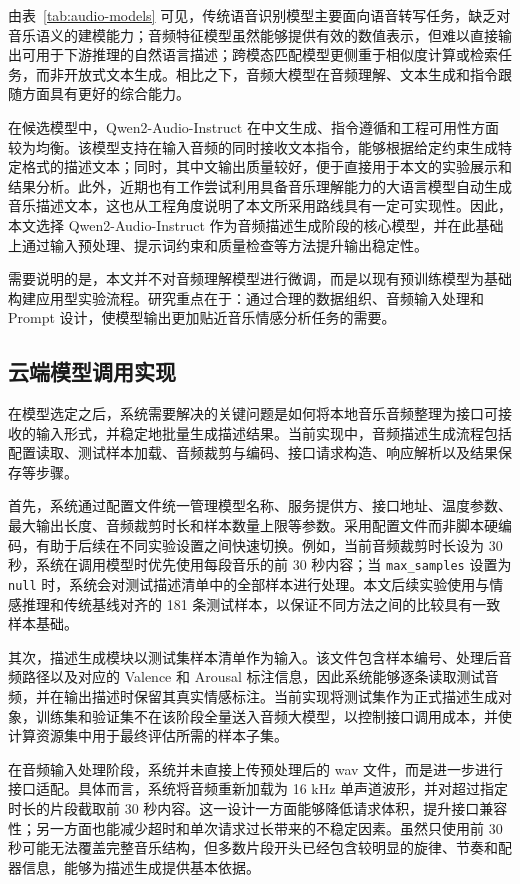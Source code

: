 由表~\ref{tab:audio-models} 可见，传统语音识别模型主要面向语音转写任务，缺乏对音乐语义的建模能力；音频特征模型虽然能够提供有效的数值表示，但难以直接输出可用于下游推理的自然语言描述；跨模态匹配模型更侧重于相似度计算或检索任务，而非开放式文本生成。相比之下，音频大模型在音频理解、文本生成和指令跟随方面具有更好的综合能力\cite{tang2023salmonn,chu2024qwen2audio}。

在候选模型中，Qwen2-Audio-Instruct\cite{chu2024qwen2audio} 在中文生成、指令遵循和工程可用性方面较为均衡。该模型支持在输入音频的同时接收文本指令，能够根据给定约束生成特定格式的描述文本；同时，其中文输出质量较好，便于直接用于本文的实验展示和结果分析。此外，近期也有工作尝试利用具备音乐理解能力的大语言模型自动生成音乐描述文本\cite{zhang2024musicpatent}，这也从工程角度说明了本文所采用路线具有一定可实现性。因此，本文选择 Qwen2-Audio-Instruct 作为音频描述生成阶段的核心模型，并在此基础上通过输入预处理、提示词约束和质量检查等方法提升输出稳定性。

需要说明的是，本文并不对音频理解模型进行微调，而是以现有预训练模型为基础构建应用型实验流程。研究重点在于：通过合理的数据组织、音频输入处理和 Prompt 设计，使模型输出更加贴近音乐情感分析任务的需要。

\subsection{云端模型调用实现}

在模型选定之后，系统需要解决的关键问题是如何将本地音乐音频整理为接口可接收的输入形式，并稳定地批量生成描述结果。当前实现中，音频描述生成流程包括配置读取、测试样本加载、音频裁剪与编码、接口请求构造、响应解析以及结果保存等步骤。

首先，系统通过配置文件统一管理模型名称、服务提供方、接口地址、温度参数、最大输出长度、音频裁剪时长和样本数量上限等参数。采用配置文件而非脚本硬编码，有助于后续在不同实验设置之间快速切换。例如，当前音频裁剪时长设为 30 秒，系统在调用模型时优先使用每段音乐的前 30 秒内容；当 \texttt{max\_samples} 设置为 \texttt{null} 时，系统会对测试描述清单中的全部样本进行处理。本文后续实验使用与情感推理和传统基线对齐的 181 条测试样本，以保证不同方法之间的比较具有一致样本基础。

其次，描述生成模块以测试集样本清单作为输入。该文件包含样本编号、处理后音频路径以及对应的 Valence 和 Arousal 标注信息，因此系统能够逐条读取测试音频，并在输出描述时保留其真实情感标注。当前实现将测试集作为正式描述生成对象，训练集和验证集不在该阶段全量送入音频大模型，以控制接口调用成本，并使计算资源集中用于最终评估所需的样本子集。

在音频输入处理阶段，系统并未直接上传预处理后的 wav 文件，而是进一步进行接口适配。具体而言，系统将音频重新加载为 16 kHz 单声道波形，并对超过指定时长的片段截取前 30 秒内容。这一设计一方面能够降低请求体积，提升接口兼容性；另一方面也能减少超时和单次请求过长带来的不稳定因素。虽然只使用前 30 秒可能无法覆盖完整音乐结构，但多数片段开头已经包含较明显的旋律、节奏和配器信息，能够为描述生成提供基本依据。


